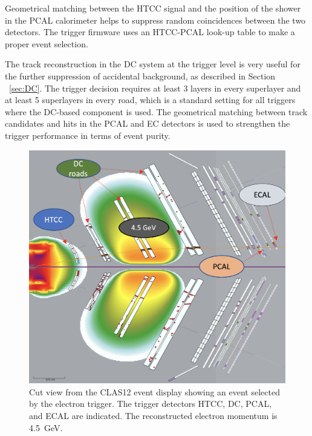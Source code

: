 Geometrical matching between the HTCC signal and the position of the shower in the PCAL calorimeter helps to
suppress random coincidences between the two detectors. The trigger firmware uses an HTCC-PCAL look-up
table to make a proper event selection.

The track reconstruction in the DC system at the trigger level is very useful for the further suppression of
accidental background, as described in Section ~\ref{sec:DC}. The trigger decision requires at least 3 layers
in every superlayer and at least 5 superlayers in every road, which is a standard setting for all triggers where
the DC-based component is used. The geometrical matching between track candidates and hits in the PCAL and
EC detectors is used to strengthen the trigger performance in terms of event purity.

\begin{figure}[!htb]
 	\centering
  	\includegraphics[width=0.95\columnwidth,keepaspectratio]{img/Electron_trigger.png}
 	\caption{Cut view from the CLAS12 event display showing an event selected by the electron trigger. The
          trigger detectors HTCC, DC, PCAL, and ECAL are indicated. The reconstructed electron momentum is
          4.5~GeV.}
	\label{fig:electron}
\end{figure}

